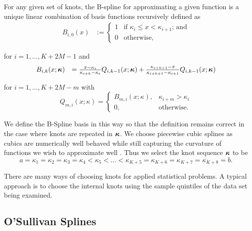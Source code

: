 For any given set of knots, the B-spline for approximating a given function is a
unique linear combination of basis functions recursively defined as
$$
\begin{array}{rl}
	B_{i, 0}(x) & := \begin{cases}                                                                                                        
	1           & \text{if } \kappa_i \leq x < \kappa_{i+1} \text{; and}                                                                                         \\
	0           & \text{otherwise,}                                                                                                        
	\end{cases}
\end{array}
$$

\noindent for $i = 1, \ldots, K + 2M -1$ and
$$
\begin{array}{rl}
	B_{i, k}(x; {\boldsymbol \kappa}) &= \frac{x - \kappa_i}{\kappa_{i + k} - \kappa_i} Q_{i, k-1} (x; {\boldsymbol \kappa}) + 
										\frac{\kappa_{i + k + 1} - x}{\kappa_{i + k + 1} - \kappa_{i + 1}} Q_{i, k-1} (x; {\boldsymbol \kappa})
\end{array}
$$

\noindent for $i = 1, \ldots, K + 2 M - m$ with
$$
Q_{m, i}(x; \kappa) =
\begin{cases}
B_{m, i}(x; \kappa),& \kappa_{i + m} > \kappa_i \\
0, & \text{otherwise}.
\end{cases}
$$

We define the B-Spline basis in this way so that the definition remains correct
in the case where knots are repeated in ${\boldsymbol \kappa}$. We choose piecewise cubic
splines as cubics are numerically well behaved while still capturing the
curvature of functions we wish to approximate well
\citep{Press:2007:NRE:1403886}. Thus we select the knot sequence ${\boldsymbol \kappa}$ to be
$$
a = \kappa_1 = \kappa_2 = \kappa_3 = \kappa_4 < \kappa_5 < \ldots < \kappa_{K+5} = \kappa_{K+6} = \kappa_{K+7} = \kappa_{K+8} = b.
$$

There are many ways of choosing knots for applied statistical problems. A
typical approach is to choose the internal knots using the sample quintiles of
the data set being examined.

\subsection{O'Sullivan Splines}

